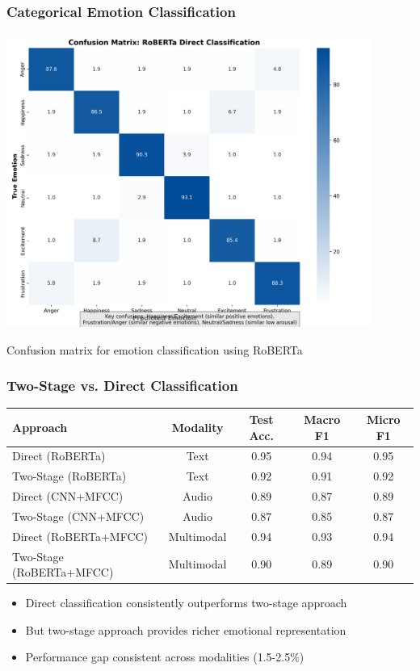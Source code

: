 \documentclass{beamer}
\begin{document}
\begin{frame}
\frametitle{Categorical Emotion Classification}
\begin{center}
\includegraphics[width=0.9\textwidth]{figures/confusion_matrix.png}
\caption{Confusion matrix for emotion classification using RoBERTa}
\end{center}
\end{frame}

\begin{frame}
\frametitle{Two-Stage vs. Direct Classification}
\begin{center}
\begin{tabular}{|l|c|c|c|c|}
\hline
\textbf{Approach} & \textbf{Modality} & \textbf{Test Acc.} & \textbf{Macro F1} & \textbf{Micro F1} \\
\hline
Direct (RoBERTa) & Text & 0.95 & 0.94 & 0.95 \\
Two-Stage (RoBERTa) & Text & 0.92 & 0.91 & 0.92 \\
\hline
Direct (CNN+MFCC) & Audio & 0.89 & 0.87 & 0.89 \\
Two-Stage (CNN+MFCC) & Audio & 0.87 & 0.85 & 0.87 \\
\hline
Direct (RoBERTa+MFCC) & Multimodal & 0.94 & 0.93 & 0.94 \\
Two-Stage (RoBERTa+MFCC) & Multimodal & 0.90 & 0.89 & 0.90 \\
\hline
\end{tabular}
\end{center}

\begin{itemize}
    \item Direct classification consistently outperforms two-stage approach
    \item But two-stage approach provides richer emotional representation
    \item Performance gap consistent across modalities (1.5-2.5\%)
\end{itemize}
\end{frame}
\end{document}
